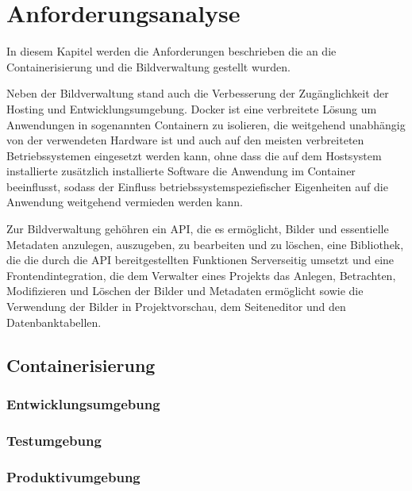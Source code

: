 \section{Anforderungsanalyse}
\label{sec:requirements}

In diesem Kapitel werden die Anforderungen beschrieben die an die
Containerisierung und die Bildverwaltung gestellt wurden.

Neben der Bildverwaltung stand auch die Verbesserung der Zug\"{a}nglichkeit der
Hosting und Entwicklungsumgebung. Docker ist eine verbreitete L\"{o}sung um
Anwendungen in sogenannten Containern zu isolieren, die weitgehend
unabh\"{a}ngig von der verwendeten Hardware ist und auch auf den meisten
verbreiteten Betriebssystemen eingesetzt werden kann, ohne dass die auf dem
Hostsystem installierte zus\"{a}tzlich installierte Software die Anwendung im
Container beeinflusst, sodass der Einfluss betriebssystemspeziefischer
Eigenheiten auf die Anwendung weitgehend vermieden werden kann.

Zur Bildverwaltung geh\"{o}hren ein API, die es erm\"{o}glicht, Bilder und
essentielle Metadaten anzulegen, auszugeben, zu bearbeiten und zu l\"{o}schen,
eine Bibliothek, die die durch die API bereitgestellten Funktionen Serverseitig
umsetzt und eine Frontendintegration, die dem Verwalter eines Projekts das
Anlegen, Betrachten, Modifizieren und L\"{o}schen der Bilder und Metadaten
erm\"{o}glicht sowie die Verwendung der Bilder in Projektvorschau, dem
Seiteneditor und den Datenbanktabellen.

\subsection{Containerisierung}



\subsubsection{Entwicklungsumgebung}



\subsubsection{Testumgebung}



\subsubsection{Produktivumgebung}



